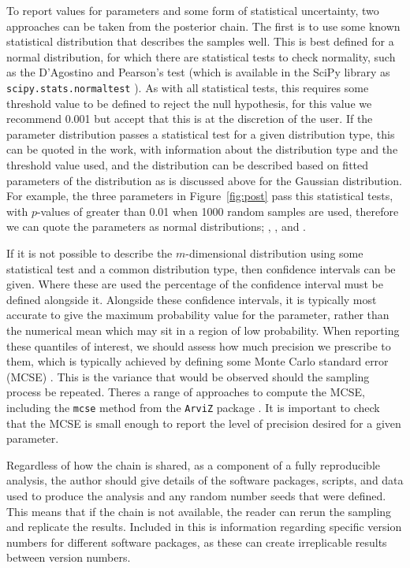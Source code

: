 \documentclass[reprint,superscriptaddress,aps,amsmath,linenumbers]{revtex4-2}
\begin{document}
To report values for parameters and some form of statistical uncertainty, two approaches can be taken from the posterior chain. 
The first is to use some known statistical distribution that describes the samples well.
This is best defined for a normal distribution, for which there are statistical tests to check normality, such as the D'Agostino and Pearson's test \cite{dagostino_omnibus_1971,dagostino_tests_1973} (which is available in the SciPy library as \texttt{scipy.stats.normaltest} \cite{virtanen_scipy_2020}).
As with all statistical tests, this requires some threshold value to be defined to reject the null hypothesis, for this value we recommend \num{0.001} but accept that this is at the discretion of the user. 
If the parameter distribution passes a statistical test for a given distribution type, this can be quoted in the work, with information about the distribution type and the threshold value used, and the distribution can be described based on fitted parameters of the distribution as is discussed above for the Gaussian distribution. 
For example, the three parameters in Figure~\ref{fig:post} pass this statistical tests, with $p$-values of greater than \num{0.01} when \num{1000} random samples are used, therefore we can quote the parameters as normal distributions; \unskip, \unskip, and \unskip.

If it is not possible to describe the $m$-dimensional distribution using some statistical test and a common distribution type, then confidence intervals can be given. 
Where these are used the percentage of the confidence interval must be defined alongside it. 
Alongside these confidence intervals, it is typically most accurate to give the maximum probability value for the parameter, rather than the numerical mean which may sit in a region of low probability.
When reporting these quantiles of interest, we should assess how much precision we prescribe to them, which is typically achieved by defining some Monte Carlo standard error (MCSE) \cite{vehtari_rank_2021}. 
This is the variance that would be observed should the sampling process be repeated. 
Theres a range of approaches to compute the MCSE, including the \texttt{mcse} method from the \texttt{ArviZ} package \cite{kumar_arviz_2019}.
It is important to check that the MCSE is small enough to report the level of precision desired for a given parameter. 

Regardless of how the chain is shared, as a component of a fully reproducible analysis, the author should give details of the software packages, scripts, and data used to produce the analysis and any random number seeds that were defined. 
This means that if the chain is not available, the reader can rerun the sampling and replicate the results. 
Included in this is information regarding specific version numbers for different software packages, as these can create irreplicable results between version numbers. 
\end{document}
